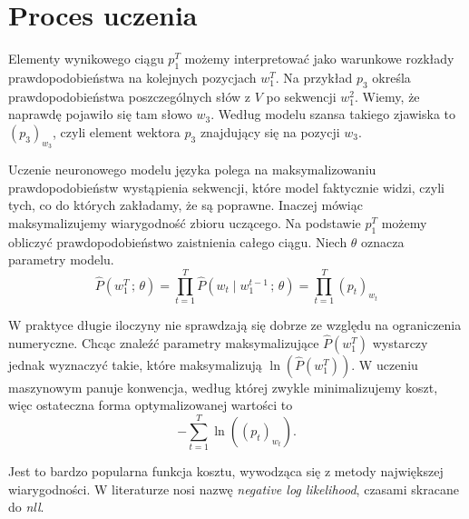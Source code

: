 
\section{Proces uczenia}
Elementy wynikowego ciągu $p_1^T$ możemy interpretować jako warunkowe rozkłady prawdopodobieństwa na kolejnych pozycjach $w_1^T$. Na przykład $p_3$ określa prawdopodobieństwa poszczególnych słów z $V$ po sekwencji $w_1^2$. Wiemy, że naprawdę pojawiło się tam słowo $w_3$. Według modelu szansa takiego zjawiska to $(p_3)_{w_3}$, czyli element wektora $p_3$ znajdujący się na pozycji $w_3$.

Uczenie neuronowego modelu języka polega na maksymalizowaniu prawdopodobieństw wystąpienia sekwencji, które model faktycznie widzi, czyli tych, co do których zakładamy, że są poprawne. Inaczej mówiąc maksymalizujemy wiarygodność zbioru uczącego. Na podstawie $p_1^T$ możemy obliczyć prawdopodobieństwo zaistnienia całego ciągu. Niech $\theta$ oznacza parametry modelu.
\[\hat{P}(w_1^T\, ;\, \theta) = \prod\limits_{t=1}^T \hat{P}(w_t \mid w_1^{t-1}\, ;\, \theta ) = \prod\limits_{t=1}^T {(p_t)}_{w_t}\]

W praktyce długie iloczyny nie sprawdzają się dobrze ze względu na ograniczenia numeryczne. Chcąc znaleźć parametry maksymalizujące $\hat{P}(w_1^T)$ wystarczy jednak wyznaczyć takie, które maksymalizują $\ln(\hat{P}(w_1^T))$. W uczeniu maszynowym panuje konwencja, według której zwykle minimalizujemy koszt, więc ostateczna forma
optymalizowanej wartości to
\[-\sum\limits_{t=1}^T \ln((p_t)_{w_t}).\]

Jest to bardzo popularna funkcja kosztu, wywodząca się z metody największej wiarygodności. W literaturze nosi nazwę \textit{negative log likelihood}, czasami skracane do \textit{nll}.


